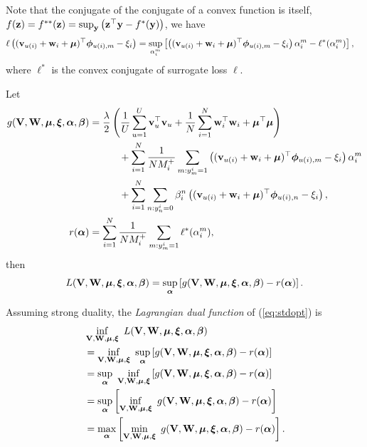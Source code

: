Note that the conjugate of the conjugate of a convex function is itself, \ie $f(\mathbf{z}) = f^{**}(\mathbf{z}) = \sup_{\mathbf{y}} \left(\mathbf{z}^\top \mathbf{y} - f^*(\mathbf{y}) \right)$, we have
\begin{equation*}
\begin{aligned}
\ell \left( (\mathbf{v}_{u(i)} + \mathbf{w}_i + \bm{\mu})^\top \bm{\phi}_{u(i),m} - \xi_i \right)
&= \sup_{\alpha_i^m} \left[ \left( (\mathbf{v}_{u(i)} + \mathbf{w}_i + \bm{\mu})^\top \bm{\phi}_{u(i),m} - \xi_i \right) \alpha_i^m - \ell^*(\alpha_i^m) \right],
\end{aligned}
\end{equation*}
where $\ell^*$ is the convex conjugate of surrogate loss $\ell$.

Let
\begin{equation*}
\begin{aligned}
g(\mathbf{V}, \mathbf{W}, \bm{\mu}, \bm{\xi}, {\bm{\alpha}}, {\bm{\beta}})
&= \frac{\lambda}{2} \left( \frac{1}{U} \sum_{u=1}^U \mathbf{v}_u^\top \mathbf{v}_u 
     + \frac{1}{N} \sum_{i=1}^N \mathbf{w}_i^\top \mathbf{w}_i + \bm{\mu}^\top \bm{\mu} \right) \\
& \hspace{3em}
     + \sum_{i=1}^N \frac{1}{N M_i^+} \sum_{m: y_m^i = 1} \left( (\mathbf{v}_{u(i)} + \mathbf{w}_i + \bm{\mu})^\top \bm{\phi}_{u(i),m} - \xi_i \right) \alpha_i^m \\
& \hspace{3em}
     + \sum_{i=1}^N \sum_{n: y_n^i = 0} \beta_i^n \left( (\mathbf{v}_{u(i)} + \mathbf{w}_i + \bm{\mu})^\top \bm{\phi}_{u(i),n} - \xi_i \right), \\
r({\bm{\alpha}})
&= \sum_{i=1}^N \frac{1}{N M_i^+} \sum_{m: y_m^i = 1} \ell^*(\alpha_i^m),
\end{aligned}
\end{equation*}
then 
\begin{equation*}
\begin{aligned}
L(\mathbf{V}, \mathbf{W}, \bm{\mu}, \bm{\xi}, {\bm{\alpha}}, {\bm{\beta}}) 
= \sup_{\bm{\alpha}} \left[ g(\mathbf{V}, \mathbf{W}, \bm{\mu}, \bm{\xi}, {\bm{\alpha}}, {\bm{\beta}}) - r({\bm{\alpha}}) \right].
\end{aligned}
\end{equation*}

Assuming strong duality, the \emph{Lagrangian dual function} of (\ref{eq:stdopt}) is
\begin{equation}
\label{eq:dualfunc}
\begin{aligned}
&\inf_{\mathbf{V}, \mathbf{W}, \bm{\mu}, \bm{\xi}} \ L(\mathbf{V}, \mathbf{W}, \bm{\mu}, \bm{\xi}, {\bm{\alpha}}, {\bm{\beta}}) \\
&= \inf_{\mathbf{V}, \mathbf{W}, \bm{\mu}, \bm{\xi}} \ \sup_{\bm{\alpha}} \left[ g(\mathbf{V}, \mathbf{W}, \bm{\mu}, \bm{\xi}, {\bm{\alpha}}, {\bm{\beta}}) - r({\bm{\alpha}}) \right] \\
&= \sup_{\bm{\alpha}} \ \inf_{\mathbf{V}, \mathbf{W}, \bm{\mu}, \bm{\xi}} \left[ g(\mathbf{V}, \mathbf{W}, \bm{\mu}, \bm{\xi}, {\bm{\alpha}}, {\bm{\beta}}) - r({\bm{\alpha}}) \right] \\
&= \sup_{\bm{\alpha}} \left[ \inf_{\mathbf{V}, \mathbf{W}, \bm{\mu}, \bm{\xi}} \ g(\mathbf{V}, \mathbf{W}, \bm{\mu}, \bm{\xi}, {\bm{\alpha}}, {\bm{\beta}}) - r({\bm{\alpha}}) \right] \\
&= \max_{\bm{\alpha}} \left[ \min_{\mathbf{V}, \mathbf{W}, \bm{\mu}, \bm{\xi}} \ g(\mathbf{V}, \mathbf{W}, \bm{\mu}, \bm{\xi}, {\bm{\alpha}}, {\bm{\beta}}) - r({\bm{\alpha}}) \right].
\end{aligned}
\end{equation}

